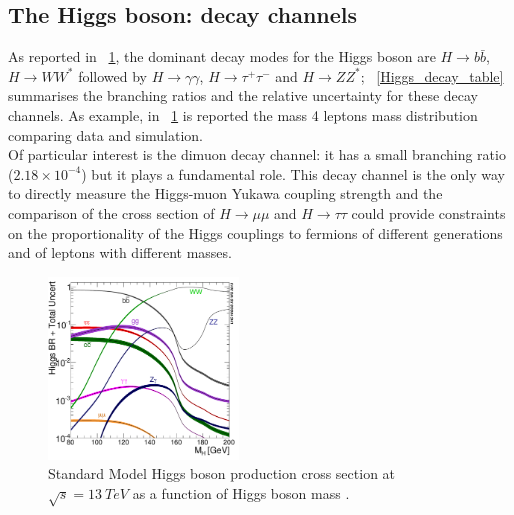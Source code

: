 \subsection{The Higgs boson: decay channels}
As reported in \figurename~\ref{Higgs_decay}, the dominant decay modes for the Higgs boson are $H \to b\bar{b}$, $H \to WW^{*}$ followed by $H \to \gamma \gamma$, $H \to \tau^{+}\tau^{-}$ and $H \to ZZ^{*}$;  \tablename~\ref{Higgs_decay_table} summarises the branching ratios and the relative uncertainty for these decay channels. As example, in \figurename~\ref{Higgs_decay} is reported the mass 4 leptons mass distribution comparing data and simulation.\\
Of particular interest is the dimuon decay channel: it has a small branching ratio ($2.18 \times 10^{-4}$) but it plays a fundamental role. This decay channel is the only way to directly measure the Higgs-muon Yukawa coupling strength and the comparison of the cross section of $H\to \mu\mu$ and $H\to \tau\tau$ could provide constraints on the proportionality of the Higgs couplings to fermions of different generations and of leptons with different masses. 
\begin{figure}[htbp]
\centering
\includegraphics[width=0.45\textwidth]{Images/Higgs_decay}
\caption{Standard Model Higgs boson production cross section at $\sqrt{s} = 13\ TeV$ as a function of Higgs boson mass \cite{HiggsTWiki}.}
\label{Higgs_decay}
\end{figure}
